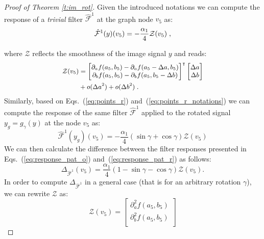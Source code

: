 \documentclass[10pt,journal,compsoc]{IEEEtran}
\newcommand{\hmF}{\hat{\mathcal{F}}}
\begin{document}
\begin{proof}[Proof of Theorem \ref{t:im_rot}]
		Given the introduced notations we can compute the response of a \emph{trivial} filter $\hmF^1$ at the graph node $v_5$ as:
		\begin{equation}
		\small
		\hmF^1(y)(v_5) = - \frac{\alpha_1 }{4} \mathcal{Z}(v_5)\;,
		\label{eq:response_pat_o}
		\end{equation}


		\noindent
		where $\mathcal{Z}$ reflects the smoothness of the image signal $y$ and reads:
		\begin{equation}
		\small
		\begin{aligned}
		\mathcal{Z}(v_5) & =
		\begin{bmatrix}
		\partial_a f (a_5, b_5)  - \partial_a f (a_5-\Delta a, b_5)\\
		\partial_b f (a_5,b_5)  - \partial_b f (a_5,b_5-\Delta b)\\
		\end{bmatrix}^{\intercal}
		\begin{bmatrix}
		\Delta a \\
		\Delta b \\
		\end{bmatrix} \\
		 & + o(\Delta a^2) + o(\Delta b^2)\;.
		\end{aligned}
		\end{equation}
		\noindent
		Similarly, based on Eqs.~(\ref{eq:points_r}) and~(\ref{eq:points_r_notations}) we can compute the response of the same filter $\hmF^1$ applied to the rotated signal $y_g = g_{\gamma}(y)$ at the node $v_5$ as:
		\begin{equation}
		\hmF^{1}(y_g)(v_5) = - \frac{\alpha_1}{4} (\sin\gamma + \cos\gamma) \mathcal{Z}(v_5)
		\label{eq:response_pat_r}
		\end{equation}
		\noindent
		We can then calculate the difference between the filter responses presented in Eqs.~(\ref{eq:response_pat_o}) and~(\ref{eq:response_pat_r}) as follows:
		\begin{equation}
		\Delta_{\hmF^1}(v_5) = \frac{\alpha_1}{4} (1 - \sin\gamma - \cos\gamma) \mathcal{Z}(v_5).
		\label{eq:diff_resp}
		\end{equation}
		In order to compute $\Delta_{\hmF^1}$ in a general case (that is for an arbitrary rotation $\gamma$), we can rewrite $\mathcal{Z}$ as:
		\begin{equation}
		\mathcal{Z}(v_5) =
		\begin{bmatrix}
		\partial_a^2 f (a_5, b_5)\\
		\partial_b^2 f (a_5,b_5)\\

\end{bmatrix}
\end{equation}
\end{proof}
\end{document}
